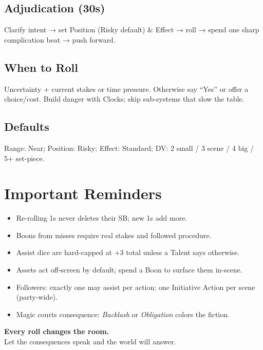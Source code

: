 \begin{multicols}{2}
\subsection*{Adjudication (30s)}
Clarify intent → set Position (Risky default) \& Effect → roll → spend one sharp complication beat → push forward.

\subsection*{When to Roll}
Uncertainty + current stakes or time pressure. Otherwise say “Yes” or offer a choice/cost. Build danger with Clocks; skip sub-systems that slow the table.

\subsection*{Defaults}
Range: Near; Position: Risky; Effect: Standard; DV: 2 small / 3 scene / 4 big / 5+ set-piece.

\section{Important Reminders}
\begin{itemize}
  \item Re-rolling 1s never deletes their SB; new 1s add more.
  \item Boons from misses require real stakes and followed procedure.
  \item Assist dice are hard-capped at +3 total unless a Talent says otherwise.
  \item Assets act off-screen by default; spend a Boon to surface them in-scene.
  \item Followers: exactly one may assist per action; one Initiative Action per scene (party-wide).
  \item Magic courts consequence: \emph{Backlash} or \emph{Obligation} colors the fiction.
\end{itemize}

\begin{center}\Large
\textbf{Every roll changes the room.}\\
Let the consequences speak and the world will answer.
\end{center}

\end{multicols}
